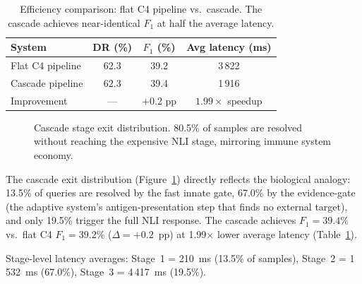 \documentclass[11pt,a4paper]{article}
\newcommand{\fone}{F_1}
\begin{document}
\begin{table}[htb]
\centering
\caption{Efficiency comparison: flat C4 pipeline vs.\ cascade. The cascade
achieves near-identical $\fone$ at half the average latency.}
\label{tab:efficiency}
\begin{tabular}{lccc}
\toprule
\textbf{System} & \textbf{DR (\%)} & \textbf{$\fone$ (\%)} & \textbf{Avg latency (ms)} \\
\midrule
Flat C4 pipeline & 62.3 & 39.2 & 3\,822 \\
Cascade pipeline & 62.3 & 39.4 & 1\,916 \\
\midrule
Improvement      & --- & $+$0.2 pp & $\mathbf{1.99\times}$ speedup \\
\bottomrule
\end{tabular}
\end{table}

\begin{figure}[htb]
\centering
{}
\caption{Cascade stage exit distribution. 80.5\% of samples are resolved
without reaching the expensive NLI stage, mirroring immune system economy.}
\label{fig:exits}
\end{figure}

The cascade exit distribution (Figure~\ref{fig:exits}) directly reflects the
biological analogy: 13.5\% of queries are resolved by the fast innate gate,
67.0\% by the evidence-gate (the adaptive system's antigen-presentation step
that finds no external target), and only 19.5\% trigger the full NLI response.
The cascade achieves $\fone = 39.4\%$ vs.\ flat C4 $\fone = 39.2\%$ ($\Delta
= +0.2$~pp) at 1.99$\times$ lower average latency (Table~\ref{tab:efficiency}).

Stage-level latency averages: Stage~1 = 210~ms (13.5\% of samples),
Stage~2 = 1\,532~ms (67.0\%), Stage~3 = 4\,417~ms (19.5\%).
\end{document}
